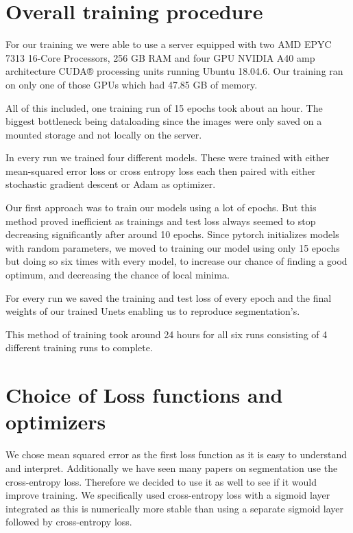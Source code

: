 \section{Overall training procedure}

For our training we were able to use a server equipped with two AMD EPYC 7313 16-Core Processors, 256 GB RAM and four GPU NVIDIA A40 amp architecture CUDA® processing units running Ubuntu 18.04.6.
Our training ran on only one of those GPUs which had 47.85 GB of memory.

All of this included, one training run of 15 epochs took about an hour. The biggest bottleneck being dataloading since the images were only saved on a mounted storage and not locally on the server.

In every run we trained four different models. These were trained with either mean-squared error loss or cross entropy loss each then paired with either stochastic gradient descent or Adam as optimizer.

Our first approach was to train our models using a lot of epochs. But this method proved inefficient as trainings and test loss always seemed to stop decreasing significantly after around 10 epochs.
Since pytorch initializes models with random parameters, we moved to training our model using only 15 epochs but doing so six times with every model, to increase our chance of finding a good optimum, and decreasing the chance of local minima.

For every run we saved the training and test loss of every epoch and the final weights of our trained Unets enabling us to reproduce segmentation's.

This method of training took around 24 hours for all six runs consisting of 4 different training runs to complete.
\vspace{3 em}
\section{Choice of Loss functions and optimizers}
We chose mean squared error as the first loss function as it is easy to understand and interpret. Additionally we have seen many papers on segmentation use the cross-entropy loss.
Therefore we decided to use it as well to see if it would improve training. We specifically used cross-entropy loss with a sigmoid layer integrated as this is numerically more stable than using a separate sigmoid layer followed by cross-entropy loss.

